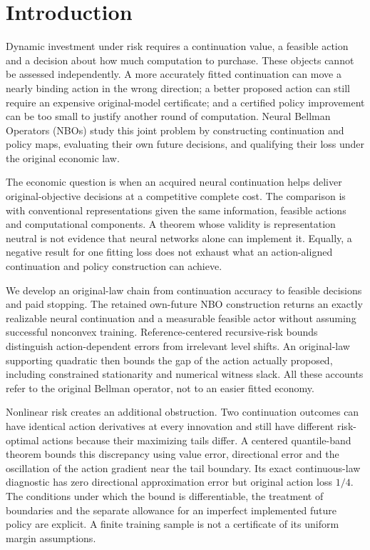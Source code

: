\section{Introduction}\label{sec:intro110}
Dynamic investment under risk requires a continuation value, a feasible action and a decision about how much computation to purchase. These objects cannot be assessed independently. A more accurately fitted continuation can move a nearly binding action in the wrong direction; a better proposed action can still require an expensive original-model certificate; and a certified policy improvement can be too small to justify another round of computation. Neural Bellman Operators (NBOs) study this joint problem by constructing continuation and policy maps, evaluating their own future decisions, and qualifying their loss under the original economic law.

The economic question is when an acquired neural continuation helps deliver original-objective decisions at a competitive complete cost. The comparison is with conventional representations given the same information, feasible actions and computational components. A theorem whose validity is representation neutral is not evidence that neural networks alone can implement it. Equally, a negative result for one fitting loss does not exhaust what an action-aligned continuation and policy construction can achieve.

We develop an original-law chain from continuation accuracy to feasible decisions and paid stopping. The retained own-future NBO construction returns an exactly realizable neural continuation and a measurable feasible actor without assuming successful nonconvex training. Reference-centered recursive-risk bounds distinguish action-dependent errors from irrelevant level shifts. An original-law supporting quadratic then bounds the gap of the action actually proposed, including constrained stationarity and numerical witness slack. All these accounts refer to the original Bellman operator, not to an easier fitted economy.

Nonlinear risk creates an additional obstruction. Two continuation outcomes can have identical action derivatives at every innovation and still have different risk-optimal actions because their maximizing tails differ. A centered quantile-band theorem bounds this discrepancy using value error, directional error and the oscillation of the action gradient near the tail boundary. Its exact continuous-law diagnostic has zero directional approximation error but original action loss $1/4$. The conditions under which the bound is differentiable, the treatment of boundaries and the separate allowance for an imperfect implemented future policy are explicit. A finite training sample is not a certificate of its uniform margin assumptions.

